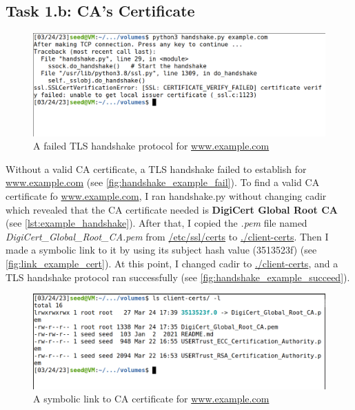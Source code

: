\subsection{Task 1.b: CA's Certificate}

\begin{figure}
    \centering
    \includegraphics[height=\textheight,width=\textwidth,keepaspectratio]
    {figures/example_fail_cert.png}
    \caption{A failed TLS handshake protocol for \url{www.example.com}}
    \label{fig:handshake_example_fail}
\end{figure}

Without a valid CA certificate, a TLS handshake failed to establish for \url{www.example.com}
(see \autoref{fig:handshake_example_fail}).
To find a valid CA certificate fo \url{www.example.com}, I ran {\selectfont
handshake.py} without changing {\selectfont cadir} which revealed that
the CA certificate needed is \textbf{DigiCert Global
Root CA} (see \autoref{lst:example_handshake}). After that, I copied the \emph{.pem}
file named \emph{DigiCert\_Global\_Root\_CA.pem}
from \url{/etc/ssl/certs} to \url{./client-certs}. Then I made a symbolic link to it by using
its subject hash value (3513523f) (see \autoref{fig:link_example_cert}). At this point, I
changed {\selectfont cadir} to \url{./client-certs}, and a TLS handshake
protocol ran successfully (see \autoref{fig:handshake_example_succeed}).

\begin{figure}
    \centering
    \includegraphics[height=\textheight,width=\textwidth,keepaspectratio]
    {figures/link_example_cert.png}
    \caption{A symbolic link to CA certificate for \url{www.example.com}}
    \label{fig:link_example_cert}
\end{figure}

